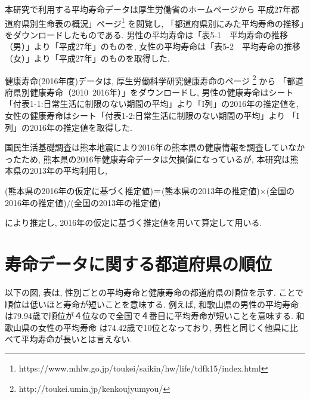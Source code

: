本研究で利用する平均寿命データは厚生労働省のホームページから
平成27年都道府県別生命表の概況」ページ\footnote{https://www.mhlw.go.jp/toukei/saikin/hw/life/tdfk15/index.html}
を閲覧し,
「都道府県別にみた平均寿命の推移」をダウンロードしたものである.
男性の平均寿命は「表5-1　平均寿命の推移（男）」より「平成27年」のものを, 女性の平均寿命は「表5-2　平均寿命の推移（女）」より「平成27年」のものを取得した.


健康寿命(2016年度)データは,
厚生労働科学研究健康寿命のページ
\footnote{http://toukei.umin.jp/kenkoujyumyou/}
から
「都道府県別健康寿命（2010~2016年）」をダウンロードし,
男性の健康寿命はシート「付表1-1:日常生活に制限のない期間の平均」より「I列」の2016年の推定値を, 女性の健康寿命はシート「付表1-2:日常生活に制限のない期間の平均」より
「I列」の2016年の推定値を取得した.

国民生活基礎調査は熊本地震により2016年の熊本県の健康情報を調査していなかったため,
熊本県の2016年健康寿命データは欠損値になっているが,
本研究は熊本県の2013年の平均利用し,

\begin{center}
	(熊本県の2016年の仮定に基づく推定値)＝(熊本県の2013年の推定値)×(全国の2016年の推定値)/(全国の2013年の推定値)
\end{center}

により推定し, 2016年の仮定に基づく推定値を用いて算定して用いる.




\newpage

\section{寿命データに関する都道府県の順位}

以下の図, 表は, 性別ごとの平均寿命と健康寿命の都道府県の順位を示す.
ことで順位は低いほと寿命が短いことを意味する.
例えば, 和歌山県の男性の平均寿命
は79.94歳で順位が４位なので全国で４番目に平均寿命が短いことを意味する.
和歌山県の女性の平均寿命
は74.42歳で10位となっており,
男性と同じく他県に比べて平均寿命が長いとは言えない.


